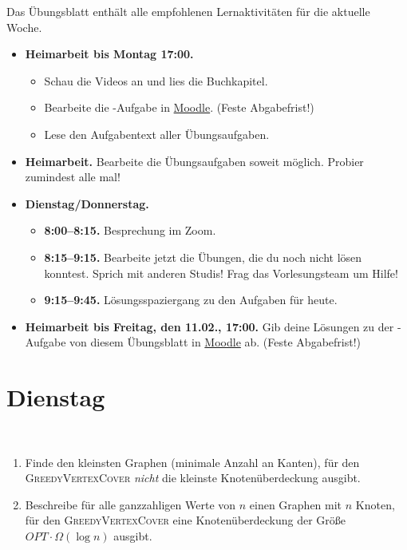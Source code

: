 \documentclass{uebung_cs}
\begin{document}
Das Übungsblatt enthält alle empfohlenen Lernaktivitäten für die aktuelle Woche.

\begin{itemize}
\item \textbf{Heimarbeit bis Montag 17:00.}
    \begin{itemize}
    \item 
    Schau die Videos an und lies die Buchkapitel.
    \item Bearbeite die -Aufgabe in \href{https://moodle.studiumdigitale.uni-frankfurt.de/moodle/course/view.php?id=2241}{Moodle}. (Feste Abgabefrist!)
    \item Lese den Aufgabentext aller Übungsaufgaben.
    \end{itemize}
\item \textbf{Heimarbeit.} Bearbeite die Übungsaufgaben soweit möglich. Probier zumindest alle mal!
\item \textbf{Dienstag/Donnerstag.}
\begin{itemize}
    \item \textbf{8:00--8:15.} Besprechung im Zoom.
    \item \textbf{8:15--9:15.} Bearbeite jetzt die Übungen, die du noch nicht lösen konntest. Sprich mit anderen Studis! Frag das Vorlesungsteam um Hilfe!
    \item \textbf{9:15--9:45.} Lösungsspaziergang zu den Aufgaben für heute.
\end{itemize}

\item \textbf{Heimarbeit bis Freitag, den 11.02., 17:00.} Gib deine Lösungen zu der -Aufgabe von diesem Übungsblatt in \href{https://moodle.studiumdigitale.uni-frankfurt.de/moodle/course/view.php?id=2241}{Moodle} ab. (Feste Abgabefrist!)
\end{itemize}

\section*{Dienstag}

\begin{aufgabe}[GreedyVertexCover]\
	\begin{enumerate}
		\item Finde den kleinsten Graphen (minimale Anzahl an Kanten), für den \textsc{GreedyVertexCover} \emph{nicht} die kleinste Knotenüberdeckung ausgibt.
		\item Beschreibe für alle ganzzahligen Werte von $n$ einen Graphen mit $n$ Knoten, für den \textsc{GreedyVertexCover} eine Knotenüberdeckung der Größe $OPT \cdot \Omega(\log n)$ ausgibt.
	\end{enumerate}
	
\end{aufgabe}
\end{document}
